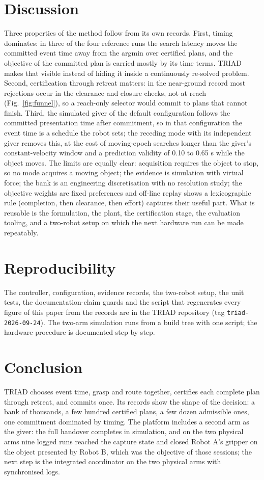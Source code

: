 \documentclass[conference]{IEEEtran}
\begin{document}
\section{Discussion}\label{sec:disc}
Three properties of the method follow from its own records. First, timing dominates: in three of the four reference runs the search latency moves the committed event time away from the argmin over certified plans, and the objective of the committed plan is carried mostly by its time terms. TRIAD makes that visible instead of hiding it inside a continuously re-solved problem. Second, certification through retreat matters: in the near-ground record most rejections occur in the clearance and closure checks, not at reach (Fig.~\ref{fig:funnel}), so a reach-only selector would commit to plans that cannot finish. Third, the simulated giver of the default configuration follows the committed presentation time after commitment, so in that configuration the event time is a schedule the robot sets; the receding mode with its independent giver removes this, at the cost of moving-epoch searches longer than the giver's constant-velocity window and a prediction validity of 0.10 to 0.65 s while the object moves. The limits are equally clear: acquisition requires the object to stop, so no mode acquires a moving object; the evidence is simulation with virtual force; the bank is an engineering discretisation with no resolution study; the objective weights are fixed preferences and off-line replay shows a lexicographic rule (completion, then clearance, then effort) captures their useful part. What is reusable is the formulation, the plant, the certification stage, the evaluation tooling, and a two-robot setup on which the next hardware run can be made repeatably.

\section{Reproducibility}\label{sec:repro}
The controller, configuration, evidence records, the two-robot setup, the unit tests, the documentation-claim guards and the script that regenerates every figure of this paper from the records are in the TRIAD repository (tag \texttt{triad-2026-09-24}). The two-arm simulation runs from a build tree with one script; the hardware procedure is documented step by step.

\section{Conclusion}\label{sec:conc}
TRIAD chooses event time, grasp and route together, certifies each complete plan through retreat, and commits once. Its records show the shape of the decision: a bank of thousands, a few hundred certified plans, a few dozen admissible ones, one commitment dominated by timing. The platform includes a second arm as the giver: the full handover completes in simulation, and on the two physical arms nine logged runs reached the capture state and closed Robot A's gripper on the object presented by Robot B, which was the objective of those sessions; the next step is the integrated coordinator on the two physical arms with synchronised logs.
\end{document}
